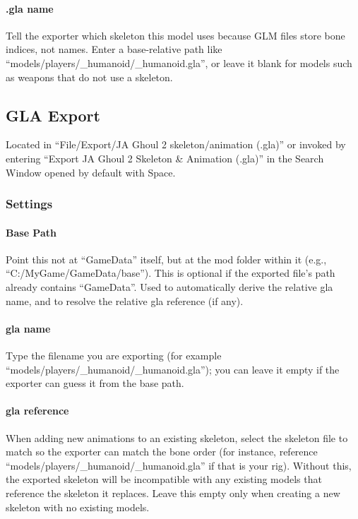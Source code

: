 \documentclass[a4paper,10pt]{article}
\begin{document}
\paragraph*{.gla name}
Tell the exporter which skeleton this model uses because GLM files store bone indices, not names. Enter a
base-relative path like ``models/players/\_humanoid/\_humanoid.gla'', or leave it blank for models such as
weapons that do not use a skeleton.
 
 
 \subsection{GLA Export}
 
 Located in ``File/Export/JA Ghoul 2 skeleton/animation (.gla)'' or invoked by entering ``Export JA Ghoul 2 
 Skeleton \& Animation (.gla)'' in the Search Window opened by default with Space.
 
 \subsubsection*{Settings}
 
\paragraph*{Base Path}
Point this not at ``GameData'' itself, but at the mod folder within it (e.g., ``C:/MyGame/GameData/base'').
This is optional if the exported file's path already contains ``GameData''. Used to automatically derive
the relative gla name, and to resolve the relative gla reference (if any).

\paragraph*{gla name}
Type the filename you are exporting (for example ``models/players/\_humanoid/\_humanoid.gla''); you can leave it
empty if the exporter can guess it from the base path.

\paragraph*{gla reference}
When adding new animations to an existing skeleton, select the skeleton file to match so the exporter can match
the bone order (for instance, reference ``models/players/\_humanoid/\_humanoid.gla'' if that is your rig).
Without this, the exported skeleton will be incompatible with any existing models that reference the skeleton
it replaces. Leave this empty only when creating a new skeleton with no existing models.
 
\end{document}
